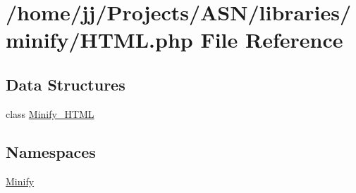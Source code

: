 \hypertarget{_h_t_m_l_8php}{}\section{/home/jj/\+Projects/\+A\+S\+N/libraries/minify/\+H\+T\+ML.php File Reference}
\label{_h_t_m_l_8php}
\subsection*{Data Structures}
\begin{DoxyCompactItemize}
\item 
class \hyperlink{class_minify___h_t_m_l}{Minify\+\_\+\+H\+T\+ML}
\end{DoxyCompactItemize}
\subsection*{Namespaces}
\begin{DoxyCompactItemize}
\item 
 \hyperlink{namespace_minify}{Minify}
\end{DoxyCompactItemize}
